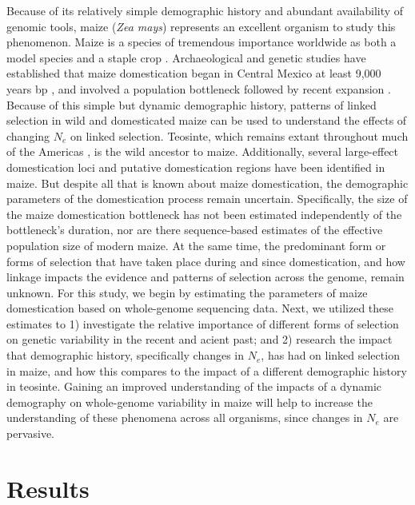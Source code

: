 \documentclass{pnastwo}
\begin{document}
\begin{article}
Because of its relatively simple demographic history and abundant availability of genomic tools, maize (\emph{Zea mays}) represents an excellent organism to study this phenomenon. Maize is a species of tremendous importance worldwide as both a model species \cite{strable2009} and a staple crop \cite{shiferaw2011}. Archaeological and genetic studies have established that maize domestication began in
Central Mexico at least 9,000 years bp
\cite{smith1995,matsuoka2002}, and involved a population bottleneck followed by recent expansion \cite{wright2005}. Because of this simple but dynamic demographic history, patterns of linked selection in wild and domesticated maize can be used to understand the effects of changing $N_e$ on linked selection. Teosinte, which remains extant throughout much of the Americas \cite{wilkes1967}, is the wild ancestor to maize. Additionally, several large-effect
domestication loci \cite{doebley1995, wills2013, wang2015} and putative domestication
regions \cite{hufford2012} have been identified in maize. But despite all that is
known about maize domestication, the demographic parameters of the
domestication process remain uncertain. Specifically, the size of the
maize domestication bottleneck has not been estimated independently of
the bottleneck's duration, nor are there sequence-based estimates of the effective
population size of modern maize. At the same time, the predominant form or forms of selection that have taken place during and since domestication, and how linkage impacts the evidence and patterns of selection across the genome, remain unknown. 
For this study, we begin by estimating the parameters of maize domestication based on whole-genome sequencing data. Next, we utilized these estimates to 1) investigate the relative importance of different forms of selection on genetic
variability in the recent and acient past; and 2) research the impact that demographic history, specifically changes in $N_e$, has had on linked selection in maize, and how this compares to the impact of a different demographic history in teosinte. Gaining an improved understanding of the impacts of a dynamic demography on whole-genome variability in maize will help to increase the understanding of these phenomena across all organisms, since changes in $N_e$ are pervasive. 

\section{Results}



\end{article}
\end{document}
